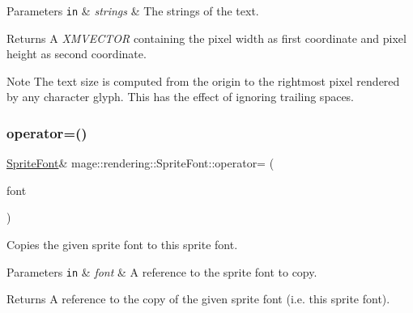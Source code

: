 \begin{DoxyParams}[1]{Parameters}
\mbox{\tt in}  & {\em strings} & The strings of the text. \\
\hline
\end{DoxyParams}
\begin{DoxyReturn}{Returns}
A {\itshape X\+M\+V\+E\+C\+T\+OR} containing the pixel width as first coordinate and pixel height as second coordinate. 
\end{DoxyReturn}
\begin{DoxyNote}{Note}
The text size is computed from the origin to the rightmost pixel rendered by any character glyph. This has the effect of ignoring \textquotesingle{}trailing spaces\textquotesingle{}. 
\end{DoxyNote}
\mbox{\label{classmage_1_1rendering_1_1_sprite_font_a3d0054493b983437a392c807523d744e}} 
\subsubsection{\texorpdfstring{operator=()}{operator=()}\hspace{0.1cm}{\footnotesize\ttfamily [1/2]}}
{\footnotesize\ttfamily \mbox{\hyperlink{classmage_1_1rendering_1_1_sprite_font}{Sprite\+Font}}\& mage\+::rendering\+::\+Sprite\+Font\+::operator= (\begin{DoxyParamCaption}\item[{const \mbox{\hyperlink{classmage_1_1rendering_1_1_sprite_font}{Sprite\+Font}} \&}]{font }\end{DoxyParamCaption})\hspace{0.3cm}{\ttfamily [delete]}}

Copies the given sprite font to this sprite font.


\begin{DoxyParams}[1]{Parameters}
\mbox{\tt in}  & {\em font} & A reference to the sprite font to copy. \\
\hline
\end{DoxyParams}
\begin{DoxyReturn}{Returns}
A reference to the copy of the given sprite font (i.\+e. this sprite font). 
\end{DoxyReturn}
\mbox{\label{classmage_1_1rendering_1_1_sprite_font_a95317d173b64565c6cba865ca524fe2f}} 
